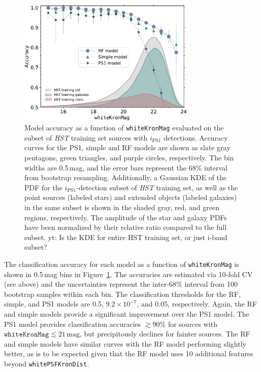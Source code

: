 \documentclass[twocolumn]{aastex62}
\newcommand{\yutaro}[1]{{\color{red} yt: {#1}}}
\begin{document}
\begin{CJK*}{UTF8}{gbsn}
\begin{figure}[t]
 \centering
  \includegraphics[width=3.35in]{./Figures/CV_Accuracy_HST.pdf}
  \caption{Model accuracy as a function of \texttt{whiteKronMag} evaluated
  on the subset of \textit{HST} training set sources with $i_\mathrm{PS1}$
  detections. Accuracy curves for the PS1, simple and RF models are shown as
  slate gray pentagons, green triangles, and purple circles, respectively. The bin
  widths are 0.5\,mag, and the error bars represent the 68\% interval from
  bootstrap resampling. Additionally, a Gaussian KDE of the PDF for the
  $i_\mathrm{PS1}$-detection subset of \textit{HST} training set, as well as
  the point sources (labeled stars) and extended objects (labeled galaxies)
  in the same subset is shown in the shaded gray, red, and green regions,
  respectively. The amplitude of the star and galaxy PDFs have been
  normalized by their relative ratio compared to the full subset. \yutaro{Is
  the KDE for entire HST training set, or just i-band subset?}}
  \label{fig:cvacc_hst}
\end{figure}

The classification accuracy for each model as a function of
\texttt{whiteKronMag} is shown in 0.5\,mag bins in
Figure~\ref{fig:cvacc_hst}. The accuracies are estimated via 10-fold CV (see
above) and the uncertainties represent the inter-68\% interval from
100 bootstrap samples within each bin. 
The classification thresholds for the RF, simple, and PS1 models are 0.5,
$9.2 \times 10^{-7}$, and 0.05, respectively. Again, the RF and simple
models provide a significant improvement over the PS1 model. The PS1 model
provides classification accuracies $\gtrsim$90\% for sources with
$\mathtt{whiteKronMag} \lesssim 21\,\mathrm{mag}$, but precipitously
declines for fainter sources. The RF and simple models have similar curves
with the RF model performing slightly better, as is to be expected given
that the RF model uses 10 additional features beyond
\texttt{whitePSFKronDist}.


\end{CJK*}
\end{document}
